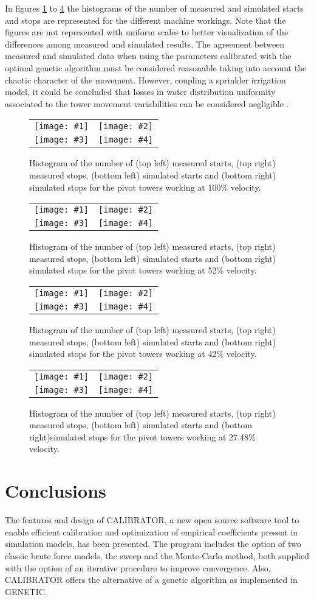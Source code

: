 \documentclass[review,authoryear]{elsarticle}
\newcommand{\FIGIV}[6]
{
	\begin{figure}[ht!]
		\centering
		\begin{tabular}{cc}
			\texttt{[image: \#1]} & \texttt{[image: \#2]} \\
			\texttt{[image: \#3]} & \texttt{[image: \#4]}
		\end{tabular}
		\caption{#5.\label{#6}}
	\end{figure}
}
\begin{document}
In figures \ref{FigPivot100} to \ref{FigPivot27} the histograms of the number
of measured and simulated starts and stops are represented for the different
machine workings.
Note that the figures are not represented with uniform scales to better
visualization of the differences among measured and simulated results.
The agreement between measured and simulated data when using the parameters calibrated with the optimal genetic algorithm must be considered reasonable taking into account the chaotic character of the movement.
However, coupling a sprinkler irrigation model, it could be concluded that losses in water distribution uniformity associated to the tower movement variabilities can be considered negligible \citep{Ouazaa15}.

\FIGIV{pivot-measured-starts-100.eps}{pivot-measured-stops-100.eps}
{pivot-simulated-starts-100.eps}{pivot-simulated-stops-100.eps}
{Histogram of the number of (top left) measured starts, (top right) measured stops, (bottom left)
simulated starts and (bottom right) simulated stops for the pivot towers working at 100\%
velocity}{FigPivot100}

\FIGIV{pivot-measured-starts-52.eps}{pivot-measured-stops-52.eps}
{pivot-simulated-starts-52.eps}{pivot-simulated-stops-52.eps}
{Histogram of the number of (top left) measured starts, (top right) measured stops, (bottom left)
simulated starts and (bottom right) simulated stops for the pivot towers working at 52\%
velocity}{FigPivot52}

\FIGIV{pivot-measured-starts-42.eps}{pivot-measured-stops-42.eps}
{pivot-simulated-starts-42.eps}{pivot-simulated-stops-42.eps}
{Histogram of the number of (top left) measured starts, (top right) measured stops, (bottom left)
simulated starts and (bottom right) simulated stops for the pivot towers working at 42\%
velocity}{FigPivot42}

\FIGIV{pivot-measured-starts-27,48.eps}{pivot-measured-stops-27,48.eps}
{pivot-simulated-starts-27,48.eps}{pivot-simulated-stops-27,48.eps}
{Histogram of the number of (top left) measured starts, (top right) measured stops, (bottom left)
simulated starts and (bottom right)simulated stops for the pivot towers working at 27.48\% velocity}{FigPivot27}

\section{Conclusions}

The features and design of CALIBRATOR, a new open source software tool to enable efficient calibration and optimization of empirical coefficients present in simulation models, has been presented. The program includes the option of two classic brute force models, the sweep and the Monte-Carlo method, both supplied with the option of an iterative procedure to improve convergence. Also, CALIBRATOR offers the alternative of a genetic algorithm as implemented in GENETIC.
\end{document}
